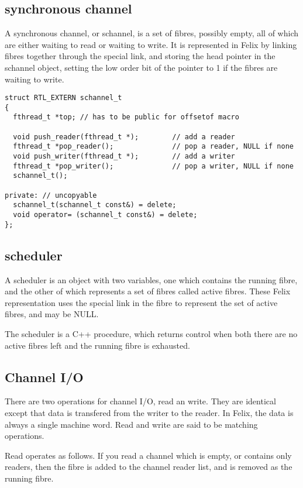 \documentclass[oneside]{book}
\begin{document}
\subsection{synchronous channel}
A synchronous channel, or schannel, is a set of fibres, possibly empty,
all of which are either waiting to read or waiting to write. It is represented
in Felix by linking fibres together through the special link, and storing
the head pointer in the schannel object, setting the low order bit of the
pointer to 1 if the fibres are waiting to write.

\begin{verbatim}
struct RTL_EXTERN schannel_t
{
  fthread_t *top; // has to be public for offsetof macro

  void push_reader(fthread_t *);        // add a reader
  fthread_t *pop_reader();              // pop a reader, NULL if none
  void push_writer(fthread_t *);        // add a writer
  fthread_t *pop_writer();              // pop a writer, NULL if none
  schannel_t();

private: // uncopyable
  schannel_t(schannel_t const&) = delete;
  void operator= (schannel_t const&) = delete;
};
\end{verbatim}

\subsection{scheduler}
A scheduler is an object with two variables, one which contains
the running fibre, and the other of which represents a set of fibres
called active fibres. These Felix representation uses the special link
in the fibre to represent the set of active fibres, and may be NULL.

The scheduler is a C++ procedure, which returns control when both there
are no active fibres left and the running fibre is exhausted.

\subsection{Channel I/O}
There are two operations for channel I/O, read an write.
They are identical except that data is transfered from the writer
to the reader. In Felix, the data is always a single machine word.
Read and write are said to be matching operations.

Read operates as follows. If you read a channel which is empty,
or contains only readers, then the fibre is added to the channel
reader list, and is removed as the running fibre.
\end{document}

